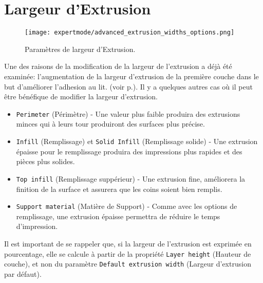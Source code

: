 
\section{Largeur d'Extrusion} %
\label{sec:extrusion_width}

\begin{figure}[H]
\centering
\texttt{[image: expertmode/advanced\_extrusion\_widths\_options.png]}
\caption{Paramètres de largeur d'Extrusion.}
\label{fig:advanced_extrusion_widths_options}
\end{figure}

Une des raisons de la modification de la largeur de l'extrusion a déjà été examinée: l'augmentation de la largeur d'extrusion de la première couche dans le but d'améliorer l'adhesion au lit. (voir p.\pageref{par:wider_extrusion_width}).  Il y a quelques autres cas où il peut être bénéfique de modifier la largeur d'extrusion.
\begin{itemize}
    \item \texttt{Perimeter} (Périmètre) - Une valeur plus faible produira des extrusions minces qui à leurs tour produiront des surfaces plus précise.
    \item \texttt{Infill} (Remplissage) et \texttt{Solid Infill} (Remplissage solide) - Une extrusion épaisse pour le remplissage produira des impressions plus rapides et des pièces plus solides.
    \item \texttt{Top infill} (Remplissage suppérieur) - Une extrusion fine, améliorera la finition de la surface et assurera que les coins soient bien remplis.
    \item \texttt{Support material} (Matière de Support) - Comme avec les options de remplissage, une extrusion épaisse permettra de réduire le temps d'impression.
\end{itemize}

Il est important de se rappeler que, si la largeur de l'extrusion est exprimée en pourcentage, elle se calcule à partir de la propriété \texttt{Layer height} (Hauteur de couche), et non du paramètre \texttt{Default extrusion width} (Largeur d'extrusion par défaut).

